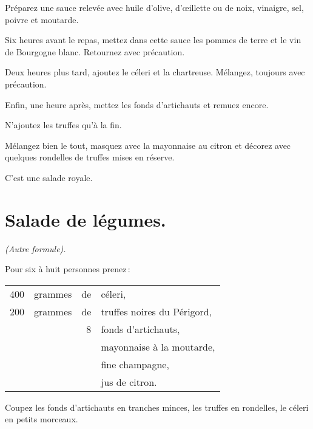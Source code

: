 Préparez une sauce relevée avec huile d'olive, d'œillette ou de noix, vinaigre,
sel, poivre et moutarde.

Six heures avant le repas, mettez dans cette sauce les pommes de terre et le vin
de Bourgogne blanc. Retournez avec précaution.

Deux heures plus tard, ajoutez le céleri et la chartreuse. Mélangez, toujours
avec précaution.

Enfin, une heure après, mettez les fonds d'artichauts et remuez encore.

N'ajoutez les truffes qu'à la fin.

Mélangez bien le tout, masquez avec la mayonnaise au citron et décorez avec
quelques rondelles de truffes mises en réserve.

C'est une salade royale.

\section*{\centering Salade de légumes.}
{}

\begin{center}
\textit{(Autre formule).}
\end{center}

Pour six à huit personnes prenez :

\footnotesize
\begin{longtable}{rrrp{16em}}
    400 & grammes & de & céleri,                                                                          \\
    200 & grammes & de & truffes noires du Périgord,                                                      \\
        &         &  8 & fonds d'artichauts,                                                              \\
        &         &    & mayonnaise à la moutarde,                                                        \\
        &         &    & fine champagne,                                                                  \\
        &         &    & jus de citron.                                                                   \\
\end{longtable}
\normalsize

Coupez les fonds d'artichauts en tranches minces, les truffes en rondelles, le
céleri en petits morceaux.

